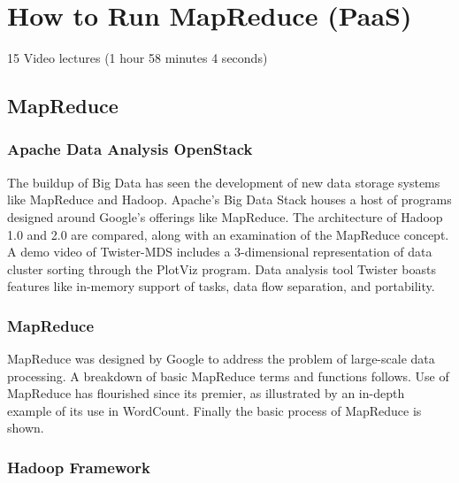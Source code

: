 \part{How to Run MapReduce (PaaS)}
\label{sec:icloud-mapreduce}


  15 Video lectures (1 hour 58 minutes 4 seconds)

\chapter{MapReduce}

\section{Apache Data Analysis OpenStack}

The buildup of Big Data has seen the development of new data storage
systems like MapReduce and Hadoop. Apache's Big Data Stack houses a host
of programs designed around Google's offerings like MapReduce. The
architecture of Hadoop 1.0 and 2.0 are compared, along with an
examination of the MapReduce concept. A demo video of Twister-MDS
includes a 3-dimensional representation of data cluster sorting through
the PlotViz program. Data analysis tool Twister boasts features like
in-memory support of tasks, data flow separation, and portability.



\section{MapReduce}

MapReduce was designed by Google to address the problem of large-scale
data processing. A breakdown of basic MapReduce terms and functions
follows. Use of MapReduce has flourished since its premier, as
illustrated by an in-depth example of its use in WordCount. Finally the
basic process of MapReduce is shown.



\section{Hadoop Framework}

